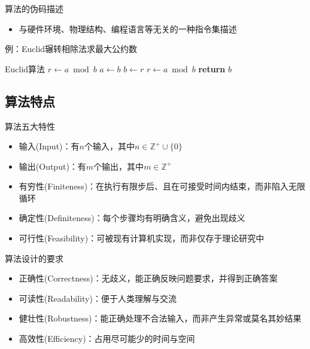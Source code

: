 \begin{fragile}
	\frametitle{\insertsubsectionhead}
	\begin{block}{算法的伪码描述}
		\begin{itemize}
			\item 与硬件环境、物理结构、编程语言等无关的一种指令集描述
		\end{itemize}
	\end{block}
	\pause
	\begin{exampleblock}{例：Euclid辗转相除法求最大公约数}
		\begin{algorithmx}{Euclid算法}
			\State $r\gets a\bmod b$
			\State $a\gets b$
			\State $b\gets r$
			\State $r\gets a\bmod b$
			\EndWhile\label{euclidendwhile}
			\State \textbf{return} $b$
			\EndProcedure
		\end{algorithmx}
	\end{exampleblock}
\end{fragile}

\subsection{算法特点}

\begin{frame}{\insertsubsectionhead}
	\begin{block}{算法五大特性}
		\begin{itemize}
			\item 输入(Input)：有$n$个输入，其中$n\in\mathbb{Z}^{+}\cup\{0\}$
			\item 输出(Output)：有$m$个输出，其中$m\in\mathbb{Z}^{+}$
			\item 有穷性(Finiteness)：在执行\alert{有限步}后、且在可接受时间内结束，而非陷入无限循环
			\item 确定性(Definiteness)：每个步骤均有\alert{明确含义}，避免出现歧义
			\item 可行性(Feasibility)：可被现有计算机\alert{实现}，而非仅存于理论研究中
		\end{itemize}
	\end{block}
\end{frame}

\begin{frame}{\insertsubsectionhead}
	\begin{block}{算法设计的要求}
		\begin{itemize}
			\item 正确性(Correctness)：无歧义，能正确反映问题要求，并得到正确答案
			\item 可读性(Readability)：便于人类理解与交流
			\item 健壮性(Robustness)：能正确处理不合法输入，而非产生异常或莫名其妙结果
			\item 高效性(Efficiency)：占用尽可能少的时间与空间
		\end{itemize}
	\end{block}
\end{frame}

